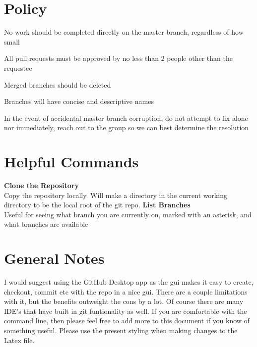 \documentclass[12pt,letterpaper]{article}
\begin{document}
\section*{Policy}
	\begin{list}{•}{}
		\item No work should be completed directly on the master branch, regardless of how small\\
		\item All pull requests must be approved by no less than 2 people other than the requestee\\
		\item Merged branches should be deleted\\
		\item Branches will have concise and descriptive names\\
		\item In the event of accidental master branch corruption, do not attempt to fix alone nor immediately, reach out to the group so we can best determine the resolution 
	\end{list}
\section*{Helpful Commands}	
	\textbf{Clone the Repository}\\
	Copy the repository locally. Will make a directory in the current working directory to be the local root of the git repo.
	\pagebreak
	\textbf{List Branches}\\
	Useful for seeing what branch you are currently on, marked with an asterisk, and what branches are available
	
\section*{General Notes}
	I would suggest using the GitHub Desktop app as the gui makes it easy to create, checkout, commit etc with the repo in a nice gui. There are a couple limitations with it, but the benefits outweight the cons by a lot. Of course there are many IDE's that have built in git funtionality as well. If you are comfortable with the command line, then please feel free to add more to this document if you know of something useful. Please use the present styling when making changes to the Latex file.
\end{document}
